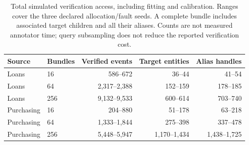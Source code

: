 \begin{table}[t]
\centering
\begin{tabular}{llrrr}
\toprule
Source & Bundles & Verified events & Target entities & Alias handles \\
\midrule
Loans & 16 & 586--672 & 36--44 & 41--54 \\
Loans & 64 & 2,317--2,388 & 152--159 & 178--185 \\
Loans & 256 & 9,132--9,533 & 600--614 & 703--740 \\
Purchasing & 16 & 204--880 & 51--178 & 63--218 \\
Purchasing & 64 & 1,333--1,844 & 275--398 & 337--478 \\
Purchasing & 256 & 5,448--5,947 & 1,170--1,434 & 1,438--1,725 \\
\bottomrule
\end{tabular}
\caption{Total simulated verification access, including fitting and calibration. Ranges cover the three declared allocation/fault seeds. A complete bundle includes associated target children and all their aliases. Counts are not measured annotator time; query subsampling does not reduce the reported verification cost.}
\label{tab:annotation-cost}
\end{table}
